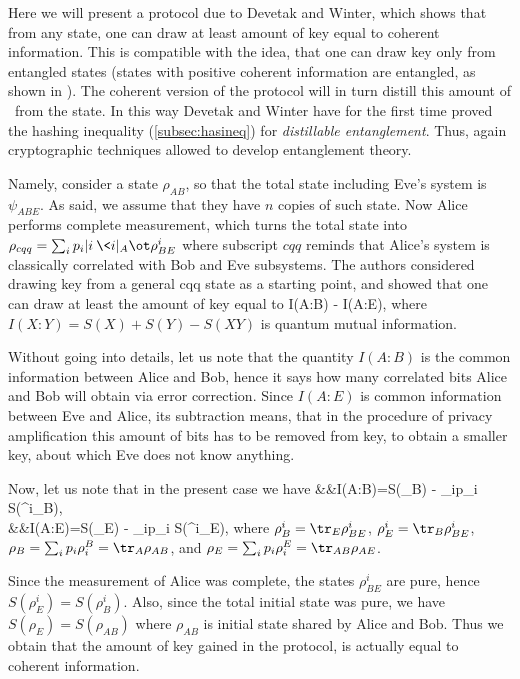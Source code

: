 \documentclass[twocolumn,aps,rmp]{revtex4}
\begin{document}
Here we will present a protocol due to Devetak and Winter, which shows
that from any state, one can draw at least amount of key equal to
coherent information.  This is compatible with the idea, that one can
draw key only from entangled states (states with positive coherent
information are entangled, as shown in \cite{RPH1994}). The coherent
version of the protocol will in turn distill this amount of \singlets\
from the state. In this way Devetak and Winter have for the first time
proved the hashing inequality (\ref{subsec:hasineq}) for {\it
  distillable entanglement}. Thus, again cryptographic techniques
allowed to develop entanglement theory.

Namely, consider a state $\rho_{AB}$, so that the total state
including Eve's system is $\psi_{ABE}$. As said, we assume that they
have $n$ copies of such state. Now Alice performs complete
measurement, which turns the total state into $\rho_{cqq} = \sum_{i}
p_i |i\>\<i|_A\ot \rho^{i}_{BE}$ where subscript $cqq$ reminds that
Alice's system is classically correlated with Bob and Eve
subsystems. The authors considered drawing key from a general cqq
state as a starting point, and showed that one can draw at least the
amount of key equal to
\be
I(A:B) - I(A:E),
\label{eq:Qckbound}
\ee
where $I(X:Y)=S(X)+S(Y)-S(XY)$ is quantum mutual information.

Without going into details, let us note that
the quantity $I(A:B)$ is the common information between
Alice and Bob, hence it says how many correlated bits Alice and Bob
will obtain via error correction. Since $I(A:E)$ is common information
between Eve and Alice, its subtraction means, that in the procedure of
privacy amplification this amount of bits has to be removed from key,
to obtain a smaller key, about which Eve does not know anything.

Now, let us note that in the present case we have
\ben
&&I(A:B)=S(\rho_B) - \sum_ip_i S(\rho^i_B), \nonumber\\
&&I(A:E)=S(\rho_E) - \sum_ip_i S(\rho^i_E),
\een
where $\rho_B^i=\tr_E\rho^i_{BE}$, $\rho_E^i=\tr_B\rho^i_{BE}$,
$\rho_B=\sum_i p_i \rho_i^B=\tr_A\rho_{AB}$, and
$\rho_E=\sum_i p_i \rho_i^E=\tr_{AB}\rho_{AE}$.

Since the measurement of Alice was complete, the states
$\rho_{BE}^i$ are pure, hence $S(\rho^i_E)=S(\rho^i_B)$. Also, since
the total initial state was pure, we have $S(\rho_E)=S(\rho_{AB})$
where $\rho_{AB}$ is initial state shared by Alice and Bob. Thus we
obtain that the amount of key gained in the protocol, is actually
equal to coherent information.
\end{document}
